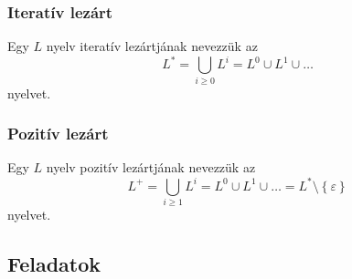 \subsubsection{Iteratív lezárt}
\begin{definition*}
	Egy $L$ nyelv iteratív lezártjának nevezzük az
	\[
	L^* = \bigcup_{i \ge 0}{L^i}=L^0 \cup L^1 \cup \dots
	\]
	nyelvet.
\end{definition*}

\subsubsection{Pozitív lezárt}
\begin{definition*}
	Egy $L$ nyelv pozitív lezártjának nevezzük az
	\[
	L^+ = \bigcup_{i \ge 1}{L^i}=L^0 \cup L^1 \cup \dots = L^* \setminus \left\lbrace \varepsilon \right\rbrace 
	\]
	nyelvet.
\end{definition*}
\newpage
\subsection{Feladatok}
